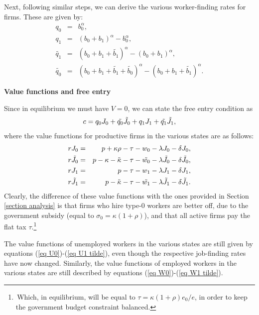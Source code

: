 \documentclass[12pt]{article} %
\theoremstyle{definition}
\begin{document}
\begin{appendix}
Next, following similar steps, we can derive the various worker-finding rates for firms. These are given by:  
\begin{eqnarray*}
	q_0 &=& b_0^\alpha, \\
	{q_1} &=&  (b_0+{b_1})^\alpha - b_0^\alpha, \\
	\tilde{q_1} &=& (b_0+b_1+\tilde{b_1})^\alpha - (b_0+{b_1})^\alpha, \\
	\tilde{q_0} &=&  (b_0+b_1+\tilde{b_1}+\tilde{b_0})^\alpha - (b_0+b_1+\tilde{b_1})^\alpha.
\end{eqnarray*}

\medskip 

\noindent \textbf{Value functions and free entry}

\medskip 

\noindent Since in equilibrium we must have $V=0$, we can state the free entry condition as 
\begin{equation}
c= q_0 J_0 + \Tilde{q_0}\Tilde{J_0} + q_1 J_1 + \Tilde{q_1}\Tilde{J_1}, \label{eq free entry intervention 4} 
\end{equation}where the value functions for productive firms in the various states are as follows: \begin{eqnarray*}rJ_0 &=&p+\kappa \rho- \tau  -w_0-\lambda J_0 - \delta J_0,\label{eq J0} \\
	r\Tilde{J_0} &=&p-\kappa-\Tilde{\kappa}- \tau -\Tilde{w_0}-\lambda \Tilde{J_0} - \delta \Tilde{J_0},\label{eq J0 tilde}\\
	rJ_1 &=&p- \tau -w_1-\lambda J_1 - \delta J_1, \label{eq J1} \\
	r\Tilde{J_1} &=&p-\Tilde{\kappa}-\tau-\Tilde{w_1}-\lambda \Tilde{J_1} - \delta \Tilde{J_1} . \label{eq J1 tilde}
\end{eqnarray*}Clearly, the difference of these value functions with the ones provided in Section \ref{section analysis} is that firms who hire type-0 workers are better off, due to the government subsidy (equal to $\sigma_0=\kappa (1+\rho)$), and that all active firms pay the flat tax $\tau$.\footnote{\,Which, in equilibrium, will be equal to $\tau = \kappa(1+\rho)e_0/e$, in order to keep the government budget constraint balanced.} 

The value functions of unemployed workers in the various states are still given by equations (\ref{eq U0})-(\ref{eq U1 tilde}), even though the respective job-finding rates have now changed. Similarly, the value functions of employed workers in the various states are still described by equations (\ref{eq W0})-(\ref{eq W1 tilde}).


\end{appendix}
\end{document}
